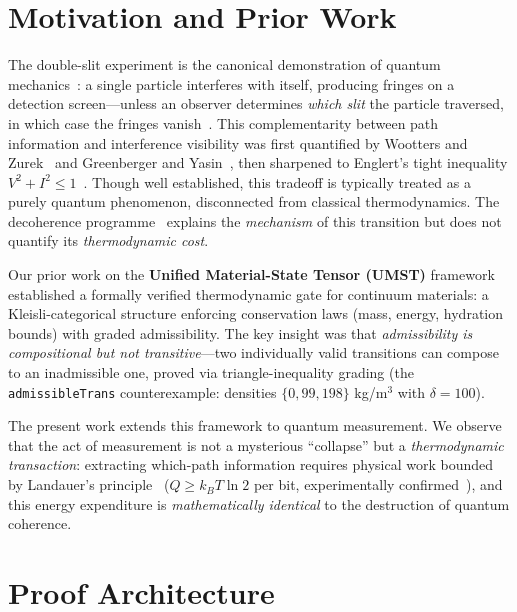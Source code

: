 \documentclass[10pt, a4paper]{article}
\begin{document}
\section{Motivation and Prior Work}

The double-slit experiment is the canonical demonstration of quantum mechanics~\cite{feynman1965, vonneumann1932}: a single particle interferes with itself, producing fringes on a detection screen---unless an observer determines \emph{which slit} the particle traversed, in which case the fringes vanish~\cite{bohr1928}. This complementarity between path information and interference visibility was first quantified by Wootters and Zurek~\cite{wootters1979} and Greenberger and Yasin~\cite{greenberger1988}, then sharpened to Englert's tight inequality $V^2 + I^2 \le 1$~\cite{englert1996}. Though well established, this tradeoff is typically treated as a purely quantum phenomenon, disconnected from classical thermodynamics. The decoherence programme~\cite{zurek2003, schlosshauer2005} explains the \emph{mechanism} of this transition but does not quantify its \emph{thermodynamic cost}.

Our prior work on the \textbf{Unified Material-State Tensor (UMST)} framework~\cite{umst-formal, fcpI, fcpII} established a formally verified thermodynamic gate for continuum materials: a Kleisli-categorical structure enforcing conservation laws (mass, energy, hydration bounds) with graded admissibility. The key insight was that \emph{admissibility is compositional but not transitive}---two individually valid transitions can compose to an inadmissible one, proved via triangle-inequality grading (the \texttt{admissibleTrans} counterexample: densities $\{0, 99, 198\}$ kg/m$^3$ with $\delta = 100$).

The present work extends this framework to quantum measurement. We observe that the act of measurement is not a mysterious ``collapse'' but a \emph{thermodynamic transaction}: extracting which-path information requires physical work bounded by Landauer's principle~\cite{landauer1961, bennett1982} ($Q \ge k_B T \ln 2$ per bit, experimentally confirmed~\cite{berut2012}), and this energy expenditure is \emph{mathematically identical} to the destruction of quantum coherence.

\section{Proof Architecture}
\end{document}
